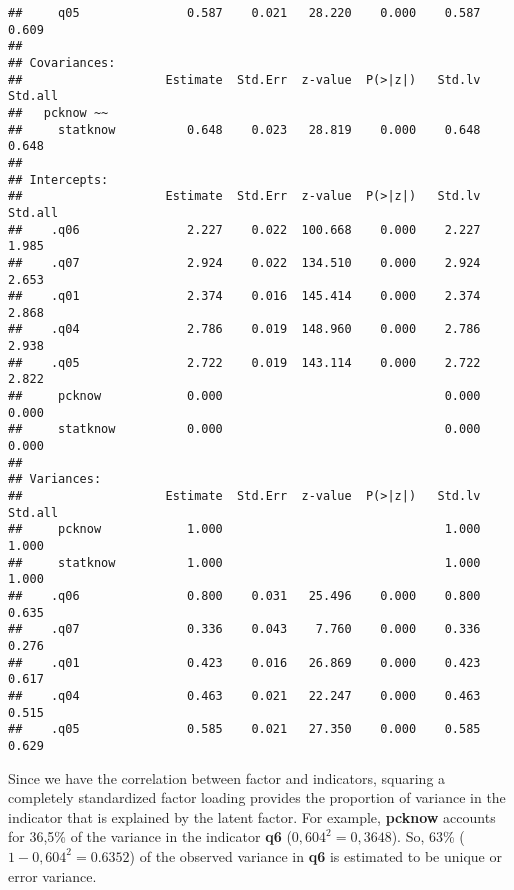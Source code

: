 \documentclass[
]{article}
\newenvironment{Shaded}{\begin{snugshade}}{\end{snugshade}}
\newcommand{\AttributeTok}[1]{\textcolor[rgb]{0.77,0.63,0.00}{#1}}
\newcommand{\ConstantTok}[1]{\textcolor[rgb]{0.00,0.00,0.00}{#1}}
\newcommand{\FloatTok}[1]{\textcolor[rgb]{0.00,0.00,0.81}{#1}}
\newcommand{\FunctionTok}[1]{\textcolor[rgb]{0.00,0.00,0.00}{#1}}
\newcommand{\NormalTok}[1]{#1}
\newcommand{\SpecialCharTok}[1]{\textcolor[rgb]{0.00,0.00,0.00}{#1}}
\newcommand{\StringTok}[1]{\textcolor[rgb]{0.31,0.60,0.02}{#1}}
\begin{document}
\begin{verbatim}
##     q05               0.587    0.021   28.220    0.000    0.587    0.609
## 
## Covariances:
##                    Estimate  Std.Err  z-value  P(>|z|)   Std.lv  Std.all
##   pcknow ~~                                                             
##     statknow          0.648    0.023   28.819    0.000    0.648    0.648
## 
## Intercepts:
##                    Estimate  Std.Err  z-value  P(>|z|)   Std.lv  Std.all
##    .q06               2.227    0.022  100.668    0.000    2.227    1.985
##    .q07               2.924    0.022  134.510    0.000    2.924    2.653
##    .q01               2.374    0.016  145.414    0.000    2.374    2.868
##    .q04               2.786    0.019  148.960    0.000    2.786    2.938
##    .q05               2.722    0.019  143.114    0.000    2.722    2.822
##     pcknow            0.000                               0.000    0.000
##     statknow          0.000                               0.000    0.000
## 
## Variances:
##                    Estimate  Std.Err  z-value  P(>|z|)   Std.lv  Std.all
##     pcknow            1.000                               1.000    1.000
##     statknow          1.000                               1.000    1.000
##    .q06               0.800    0.031   25.496    0.000    0.800    0.635
##    .q07               0.336    0.043    7.760    0.000    0.336    0.276
##    .q01               0.423    0.016   26.869    0.000    0.423    0.617
##    .q04               0.463    0.021   22.247    0.000    0.463    0.515
##    .q05               0.585    0.021   27.350    0.000    0.585    0.629
\end{verbatim}

Since we have the correlation between factor and indicators, squaring a
completely standardized factor loading provides the proportion of
variance in the indicator that is explained by the latent factor. For
example, \textbf{pcknow} accounts for 36,5\% of the variance in the
indicator \textbf{q6} (\(0,604^{2}=0,3648\)). So, 63\%
(\(1-0,604^{2}=0.6352\)) of the observed variance in \textbf{q6} is
estimated to be unique or error variance.

\begin{Shaded}
\end{Shaded}
\end{document}
